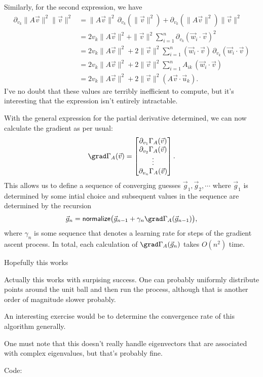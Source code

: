 \documentclass[a4paper, 12pt]{article}
\begin{document}
Similarly, for the second expression, we have
\begin{align*}
    \partial_{v_k} \| A \vec{v} \|^2 \| \vec{v} \|^2 &= \| A \vec{v} \|^2 \, \partial_{v_k} \left( \| \vec{v} \|^2 \right) + \partial_{v_k} \left( \| A \vec{v} \|^2 \right) \| \vec{v} \|^2 \\
    &= 2 v_k \| A \vec{v} \|^2 + \| \vec{v} \|^2 \sum_{i = 1}^{n} \partial_{v_k} (\vec{w}_i \cdot \vec{v})^2 \\
    &= 2 v_k \| A \vec{v} \|^2 + 2 \| \vec{v} \|^2 \sum_{i = 1}^{n} (\vec{w}_i \cdot \vec{v}) \, \partial_{v_k} (\vec{w}_i \cdot \vec{v}) \\
    &= 2 v_k \| A \vec{v} \|^2 + 2 \| \vec{v} \|^2 \sum_{i = 1}^{n} A_{ik} \, (\vec{w}_i \cdot \vec{v}) \\
    &= 2 v_k \| A \vec{v} \|^2 + 2 \| \vec{v} \|^2 (A \vec{v} \cdot \vec{u}_k)
.\end{align*}
I've no doubt that these values are terribly inefficient to compute, but it's interesting that the expression isn't entirely intractable.

With the general expression for the partial derivative determined, we can now calculate the gradient as per usual:
\[
    \grad \Gamma_A (\vec{v}) = \begin{bmatrix}
        \partial_{v_1} \Gamma_A (\vec{v}) \\
        \partial_{v_2} \Gamma_A (\vec{v}) \\
        \vdots \\
        \partial_{v_n} \Gamma_A (\vec{v})
    \end{bmatrix}
.\]
This allows us to define a sequence of converging guesses \( \vec{g}_1, \vec{g}_2, \cdots \) where \( \vec{g}_1 \) is determined by some intial choice and subsequent values in the sequence are determined by the recursion
\[
    \vec{g}_n = \textsf{normalize} \bigl(\vec{g}_{n-1} + \gamma_n \grad \Gamma_A (\vec{g}_{n-1}) \bigr)
,\]
where \( \gamma_n \) is some sequence that denotes a learning rate for steps of the gradient ascent process. In total, each calculation of \( \grad \Gamma_A (\vec{g}_n) \) takes \( O(n^2) \) time.

Hopefully this works

Actually this works with surpising success. One can probably uniformly distribute points around the unit ball and then run the process, although that is another order of magnitude slower probably.

An interesting exercise would be to determine the convergence rate of this algorithm generally.

\begin{remark}
    One must note that this doesn't really handle eigenvectors that are associated with complex eigenvalues, but that's probably fine.
\end{remark}

Code:

\end{document}
